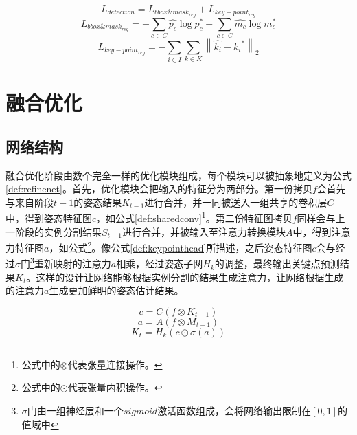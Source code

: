 \begin{equation}
\label{detection_loss}
L_{detection} = L_{bbox\&mask_{reg}} + L_{key-point_{reg}}
\end{equation}      
\begin{equation}
\label{bbox_mask_loss}
L_{bbox\&mask_{reg}} = -\sum_{c \in C}{\hat{p_c} \log{p_c^{*}}}  -\sum_{c \in C}{\hat{m_c} \log{m_c^{*}}}
\end{equation}
\begin{equation}
\label{coarse_key-point_loss}
L_{key-point_{reg}} = -\sum_{i \in I}\sum_{k \in K}{\left\| \hat{k_i} - {k_i}^{*} \right\|_2}
\end{equation}


\section{融合优化}
\label{sec:refine}
\subsection{网络结构}
\label{subsec:architecture}
融合优化阶段由数个完全一样的优化模块组成，每个模块可以被抽象地定义为公式\eqref{def:refinenet}。首先，优化模块会把输入的特征分为两部分。第一份拷贝$f$会首先与来自阶段$t-1$的姿态结果$K_{t-1}$进行合并，并一同被送入一组共享的卷积层$C$中，得到姿态特征图$c$，如公式\eqref{def:sharedconv}\footnote{公式中的$\otimes$代表张量连接操作。}。第二份特征图拷贝$f$同样会与上一阶段的实例分割结果$S_{t-1}$进行合并，并被输入至注意力转换模块$A$中，得到注意力特征图$a$，如公式\cite{def:attenconverter}\footnote{公式中的$\odot$代表张量内积操作。}。像公式\eqref{def:keypointhead}所描述，之后姿态特征图$c$会与经过$\sigma$门\footnote{$\sigma$门由一组神经层和一个$sigmoid$激活函数组成，会将网络输出限制在$[0,1]$的值域中}重新映射的注意力$a$相乘，经过姿态子网$H_k$的调整，最终输出关键点预测结果$K_t$。这样的设计让网络能够根据实例分割的结果生成注意力，让网络根据生成的注意力$a$生成更加鲜明的姿态估计结果。

\begin{equation}
\label{def:sharedconv}
c = C(f\otimes{K_{t-1}})
\end{equation}
\begin{equation}
\label{def:attenconverter}
a = A(f\otimes{M_{t-1}})
\end{equation}
\begin{equation}
\label{def:keypointhead}
K_t = H_k(c\odot \sigma(a))
\end{equation}

